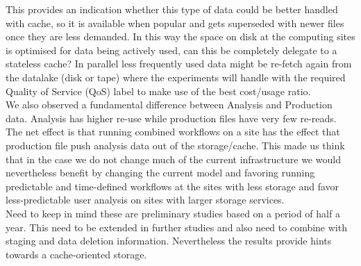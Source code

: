 This provides an indication whether this type of data could be better handled with cache, so it is available when popular and gets superseded with newer files once they are less demanded. In this way the space on disk at the computing sites is optimised for data being actively used, can this be completely delegate to a stateless cache? In parallel less frequently used data might be re-fetch again from the datalake (disk or tape) where the experiments will handle with the required Quality of Service (QoS) label to make use of the best cost/usage ratio.\\
We also observed a fundamental difference between Analysis and Production data. Analysis has higher re-use while production files have very few re-reads. The net effect is that running combined workflows on a site has the effect that production file push analysis data out of the storage/cache. This made us think that in the case we do not change much of the current infrastructure we would nevertheless benefit by changing the current model and favoring running predictable and time-defined workflows at the sites with less storage and favor less-predictable user analysis on sites with larger storage services.\\
Need to keep in mind these are preliminary studies based on a period of half a year. This need to be extended in further studies and also need to combine with staging and data deletion information. Nevertheless the results provide hints towards a cache-oriented storage.
